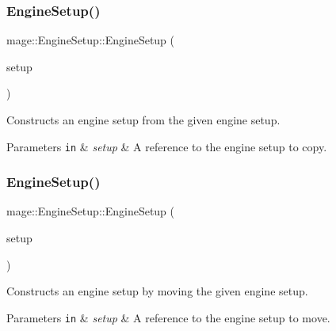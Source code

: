 \subsubsection{\texorpdfstring{Engine\+Setup()}{EngineSetup()}\hspace{0.1cm}{\footnotesize\ttfamily [2/3]}}
{\footnotesize\ttfamily mage\+::\+Engine\+Setup\+::\+Engine\+Setup (\begin{DoxyParamCaption}\item[{const \hyperlink{structmage_1_1_engine_setup}{Engine\+Setup} \&}]{setup }\end{DoxyParamCaption})\hspace{0.3cm}{\ttfamily [default]}}

Constructs an engine setup from the given engine setup.


\begin{DoxyParams}[1]{Parameters}
\mbox{\tt in}  & {\em setup} & A reference to the engine setup to copy. \\
\hline
\end{DoxyParams}
\hypertarget{structmage_1_1_engine_setup_ac199c03ba1968ca0a98a2de48cfb952d}{}\label{structmage_1_1_engine_setup_ac199c03ba1968ca0a98a2de48cfb952d} 
\subsubsection{\texorpdfstring{Engine\+Setup()}{EngineSetup()}\hspace{0.1cm}{\footnotesize\ttfamily [3/3]}}
{\footnotesize\ttfamily mage\+::\+Engine\+Setup\+::\+Engine\+Setup (\begin{DoxyParamCaption}\item[{\hyperlink{structmage_1_1_engine_setup}{Engine\+Setup} \&\&}]{setup }\end{DoxyParamCaption})\hspace{0.3cm}{\ttfamily [default]}}

Constructs an engine setup by moving the given engine setup.


\begin{DoxyParams}[1]{Parameters}
\mbox{\tt in}  & {\em setup} & A reference to the engine setup to move. \\
\hline
\end{DoxyParams}
\hypertarget{structmage_1_1_engine_setup_ac9ec3df257c585930b21b2b69c99c177}{}\label{structmage_1_1_engine_setup_ac9ec3df257c585930b21b2b69c99c177} 
